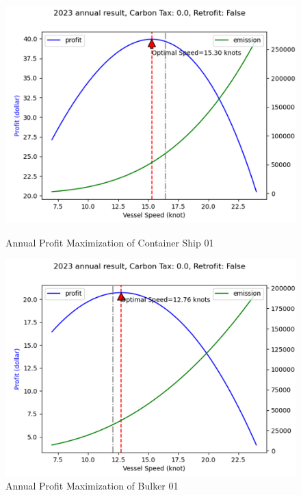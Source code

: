 \documentclass[a4paper,12pt]{article}
\begin{document}
\begin{figure}[H]
	\centering
	\begin{minipage}[t]{0.49\textwidth}
		\centering
		\includegraphics[width= \linewidth]{report-fig/container01.png}
		\caption{Annual Profit Maximization of Container Ship 01}
		\label{fig:container01}
	\end{minipage}
	\begin{minipage}[t]{0.49\textwidth}
		\centering
		\includegraphics[width= \linewidth]{report-fig/bulker01.png}
		\caption{Annual Profit Maximization of Bulker 01}
		\label{fig:bulker01}
	\end{minipage}
\end{figure}
\end{document}

